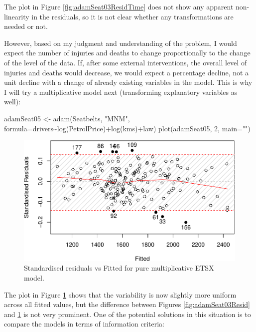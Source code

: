 \documentclass[
]{book}
\newenvironment{Shaded}{\begin{snugshade}}{\end{snugshade}}
\newcommand{\AttributeTok}[1]{\textcolor[rgb]{0.77,0.63,0.00}{#1}}
\newcommand{\DecValTok}[1]{\textcolor[rgb]{0.00,0.00,0.81}{#1}}
\newcommand{\FunctionTok}[1]{\textcolor[rgb]{0.00,0.00,0.00}{#1}}
\newcommand{\NormalTok}[1]{#1}
\newcommand{\OtherTok}[1]{\textcolor[rgb]{0.56,0.35,0.01}{#1}}
\newcommand{\SpecialCharTok}[1]{\textcolor[rgb]{0.00,0.00,0.00}{#1}}
\newcommand{\StringTok}[1]{\textcolor[rgb]{0.31,0.60,0.02}{#1}}
\theoremstyle{definition}
\theoremstyle{definition}
\theoremstyle{definition}
\theoremstyle{definition}
\theoremstyle{remark}
\begin{document}
The plot in Figure \ref{fig:adamSeat03ResidTime} does not show any apparent non-linearity in the residuals, so it is not clear whether any transformations are needed or not.

However, based on my judgment and understanding of the problem, I would expect the number of injuries and deaths to change proportionally to the change of the level of the data. If, after some external interventions, the overall level of injuries and deaths would decrease, we would expect a percentage decline, not a unit decline with a change of already existing variables in the model. This is why I will try a multiplicative model next (transforming explanatory variables as well):

\begin{Shaded}
\begin{Highlighting}[]
\NormalTok{adamSeat05 }\OtherTok{\textless{}{-}} \FunctionTok{adam}\NormalTok{(Seatbelts, }\StringTok{"MNM"}\NormalTok{,}
                   \AttributeTok{formula=}\NormalTok{drivers}\SpecialCharTok{\textasciitilde{}}\FunctionTok{log}\NormalTok{(PetrolPrice)}\SpecialCharTok{+}\FunctionTok{log}\NormalTok{(kms)}\SpecialCharTok{+}\NormalTok{law)}
\FunctionTok{plot}\NormalTok{(adamSeat05, }\DecValTok{2}\NormalTok{, }\AttributeTok{main=}\StringTok{""}\NormalTok{)}
\end{Highlighting}
\end{Shaded}

\begin{figure}
\centering
\includegraphics{Svetunkov--2022----ADAM_files/figure-latex/adamSeat05Resid-1.pdf}
\caption{\label{fig:adamSeat05Resid}Standardised residuals vs Fitted for pure multiplicative ETSX model.}
\end{figure}

The plot in Figure \ref{fig:adamSeat05Resid} shows that the variability is now slightly more uniform across all fitted values, but the difference between Figures \ref{fig:adamSeat03Resid} and \ref{fig:adamSeat05Resid} is not very prominent. One of the potential solutions in this situation is to compare the models in terms of information criteria:
\end{document}
